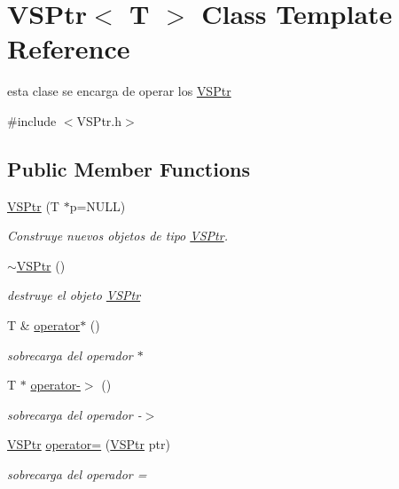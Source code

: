 \hypertarget{classVSPtr}{}\section{V\+S\+Ptr$<$ T $>$ Class Template Reference}
\label{classVSPtr}


esta clase se encarga de operar los \hyperlink{classVSPtr}{V\+S\+Ptr}  




{\ttfamily \#include $<$V\+S\+Ptr.\+h$>$}

\subsection*{Public Member Functions}
\begin{DoxyCompactItemize}
\item 
\hyperlink{classVSPtr_af09710020eb6adeb5f4b2ec05135424a}{V\+S\+Ptr} (T $\ast$p=N\+U\+LL)
\begin{DoxyCompactList}\small\item\em Construye nuevos objetos de tipo \hyperlink{classVSPtr}{V\+S\+Ptr}. \end{DoxyCompactList}\item 
\mbox{\label{classVSPtr_a7f8fbb9a7047367f57bfc2f8fbf54a99}} 
\hyperlink{classVSPtr_a7f8fbb9a7047367f57bfc2f8fbf54a99}{$\sim$\+V\+S\+Ptr} ()
\begin{DoxyCompactList}\small\item\em destruye el objeto \hyperlink{classVSPtr}{V\+S\+Ptr} \end{DoxyCompactList}\item 
T \& \hyperlink{classVSPtr_a77ecd1f1e117ff07a181c265aac5c8e3}{operator$\ast$} ()
\begin{DoxyCompactList}\small\item\em sobrecarga del operador $\ast$ \end{DoxyCompactList}\item 
T $\ast$ \hyperlink{classVSPtr_aad11db03d22be0ece564777de9415515}{operator-\/$>$} ()
\begin{DoxyCompactList}\small\item\em sobrecarga del operador -\/$>$ \end{DoxyCompactList}\item 
\hyperlink{classVSPtr}{V\+S\+Ptr} \hyperlink{classVSPtr_af568414fadd2891d8cdcede387afa657}{operator=} (\hyperlink{classVSPtr}{V\+S\+Ptr} ptr)
\begin{DoxyCompactList}\small\item\em sobrecarga del operador = \end{DoxyCompactList}\end{DoxyCompactItemize}
